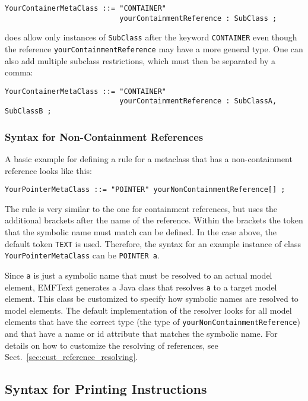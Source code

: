 \lstset{language=CS}
\begin{lstlisting}
YourContainerMetaClass ::= "CONTAINER" 
                           yourContainmentReference : SubClass ;
\end{lstlisting}

does allow only instances of \texttt{SubClass} after the keyword
\texttt{CONTAINER} even though the reference \texttt{yourContainmentReference}
may have a more general type. One can also add multiple subclass restrictions,
which must then be separated by a comma:

\lstset{language=CS}
\begin{lstlisting}
YourContainerMetaClass ::= "CONTAINER" 
                           yourContainmentReference : SubClassA, SubClassB ;
\end{lstlisting}

\subsubsection{Syntax for Non-Containment References}

A basic example for defining a rule for a metaclass that has a non-containment 
reference looks like this:

\lstset{language=CS}
\begin{lstlisting}
YourPointerMetaClass ::= "POINTER" yourNonContainmentReference[] ;
\end{lstlisting}

The rule is very similar to the one for containment references, but uses the 
additional brackets after the name of the reference. Within the brackets 
the token that the symbolic name must match can be defined. In the case above,
the default token \texttt{TEXT} is used. Therefore, the syntax for an example
instance of class \texttt{YourPointerMetaClass} can be \texttt{POINTER a}.

Since \texttt{a} is just a symbolic name that must be resolved to an actual 
model element, EMFText generates a Java class that resolves \texttt{a} to a 
target model element. This class be customized to specify how symbolic names are
resolved to model elements. The default implementation of the resolver looks 
for all model elements that have the correct type (the type of
\texttt{yourNonContainmentReference}) and that have a
name or id attribute that matches the symbolic name. For details on how to
customize the resolving of references, see
Sect.~\ref{sec:cust_reference_resolving}.

\subsection{Syntax for Printing Instructions}

